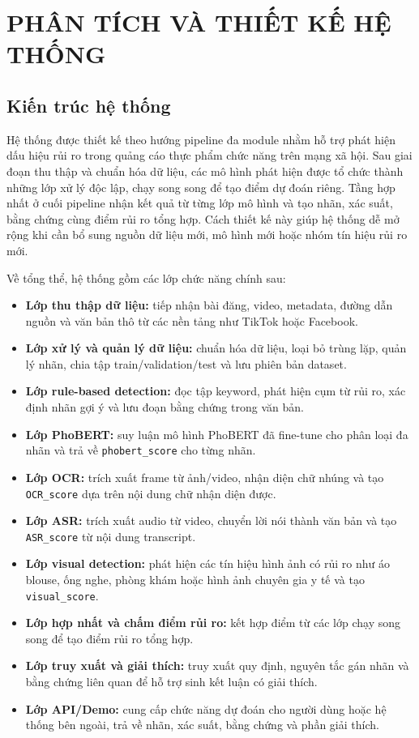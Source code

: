 \chapter{PHÂN TÍCH VÀ THIẾT KẾ HỆ THỐNG}

\section{Kiến trúc hệ thống}
Hệ thống được thiết kế theo hướng pipeline đa module nhằm hỗ trợ phát hiện dấu hiệu rủi ro trong quảng cáo thực phẩm chức năng trên mạng xã hội. Sau giai đoạn thu thập và chuẩn hóa dữ liệu, các mô hình phát hiện được tổ chức thành những lớp xử lý độc lập, chạy song song để tạo điểm dự đoán riêng. Tầng hợp nhất ở cuối pipeline nhận kết quả từ từng lớp mô hình và tạo nhãn, xác suất, bằng chứng cùng điểm rủi ro tổng hợp. Cách thiết kế này giúp hệ thống dễ mở rộng khi cần bổ sung nguồn dữ liệu mới, mô hình mới hoặc nhóm tín hiệu rủi ro mới.

Về tổng thể, hệ thống gồm các lớp chức năng chính sau:
\begin{itemize}
    \item \textbf{Lớp thu thập dữ liệu:} tiếp nhận bài đăng, video, metadata, đường dẫn nguồn và văn bản thô từ các nền tảng như TikTok hoặc Facebook.
    \item \textbf{Lớp xử lý và quản lý dữ liệu:} chuẩn hóa dữ liệu, loại bỏ trùng lặp, quản lý nhãn, chia tập train/validation/test và lưu phiên bản dataset.
    \item \textbf{Lớp rule-based detection:} đọc tập keyword, phát hiện cụm từ rủi ro, xác định nhãn gợi ý và lưu đoạn bằng chứng trong văn bản.
    \item \textbf{Lớp PhoBERT:} suy luận mô hình PhoBERT đã fine-tune cho phân loại đa nhãn và trả về \texttt{phobert\_score} cho từng nhãn.
    \item \textbf{Lớp OCR:} trích xuất frame từ ảnh/video, nhận diện chữ nhúng và tạo \texttt{OCR\_score} dựa trên nội dung chữ nhận diện được.
    \item \textbf{Lớp ASR:} trích xuất audio từ video, chuyển lời nói thành văn bản và tạo \texttt{ASR\_score} từ nội dung transcript.
    \item \textbf{Lớp visual detection:} phát hiện các tín hiệu hình ảnh có rủi ro như áo blouse, ống nghe, phòng khám hoặc hình ảnh chuyên gia y tế và tạo \texttt{visual\_score}.
    \item \textbf{Lớp hợp nhất và chấm điểm rủi ro:} kết hợp điểm từ các lớp chạy song song để tạo điểm rủi ro tổng hợp.
    \item \textbf{Lớp truy xuất và giải thích:} truy xuất quy định, nguyên tắc gán nhãn và bằng chứng liên quan để hỗ trợ sinh kết luận có giải thích.
    \item \textbf{Lớp API/Demo:} cung cấp chức năng dự đoán cho người dùng hoặc hệ thống bên ngoài, trả về nhãn, xác suất, bằng chứng và phần giải thích.
\end{itemize}

